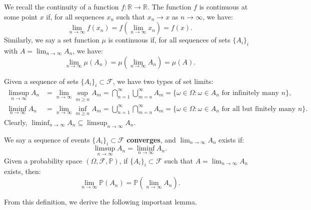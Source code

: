 \documentclass{huhtakm-template-book-v2}
\newcommand{\prob}{\mathbb{P}}
\begin{document}
    We recall the continuity of a function $f:\mathbb{R} \to \mathbb{R}$. The function $f$ is continuous at some point $x$ if, for all sequences $x_{n}$ such that $x_{n} \to x$ as $n \to \infty$, we have:
    \begin{equation*}
        \lim_{n \to \infty}f(x_{n}) = f\left(\lim_{n \to \infty}x_{n}\right) = f(x).
    \end{equation*}
    Similarly, we say a set function $\mu$ is continuous if, for all sequences of sets $\{A_{i}\}_{i}$ with $A = \lim_{n \to \infty}A_{n}$, we have:
    \begin{equation*}
        \lim_{n \to \infty}\mu(A_{n}) = \mu\left(\lim_{n \to \infty}A_{n}\right) = \mu(A).
    \end{equation*}
    \begin{rem} 
        Given a sequence of sets $\{A_{i}\}_{i}\subset\mathcal{F}$, we have two types of set limits:
        \begin{align*}
            \limsup_{n \to \infty}A_{n} &= \lim_{n \to \infty}\sup_{m \geq n}A_{m} = \bigcap_{n = 1}^{\infty}\bigcup_{m = n}^{\infty}A_{m} = \{\omega \in \Omega: \omega \in A_{n}\text{ for infinitely many }n\},\\
            \liminf_{n \to \infty}A_{n} &= \lim_{n \to \infty}\inf_{m \geq n}A_{m} = \bigcup_{n = 1}^{\infty}\bigcap_{m = n}^{\infty}A_{m} = \{\omega \in \Omega: \omega \in A_{n}\text{ for all but finitely many }n\}.
        \end{align*}
        Clearly, $\liminf_{n \to \infty}A_{n}\subseteq\limsup_{n \to \infty}A_{n}$.
    \end{rem}
    \begin{defn}
        We say a sequence of events $\{A_{i}\}_{i}\subset\mathcal{F}$ \textbf{converges}, and $\lim_{n \to \infty}A_{n}$ exists if:
        \begin{equation*}
            \limsup_{n \to \infty}A_{n} = \liminf_{n \to \infty}A_{n}.
        \end{equation*}
        Given a probability space $(\Omega,\mathcal{F},\prob)$, if $\{A_{i}\}_{i}\subset\mathcal{F}$ such that $A = \lim_{n \to \infty}A_{n}$ exists, then:
        \begin{equation*}
            \lim_{n \to \infty}\prob(A_{n}) = \prob\left(\lim_{n \to \infty}A_{n}\right).
        \end{equation*}
    \end{defn}
    From this definition, we derive the following important lemma.
\end{document}
